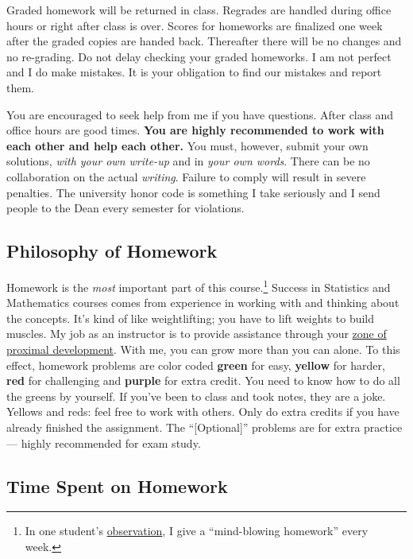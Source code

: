 \documentclass[12pt]{article}
\newcommand{\ingreen}[1]{\color{green}\textbf{#1} \color{black}}
\newcommand{\inyellow}[1]{\color{yellow}\textbf{#1} \color{black}}
\newcommand{\inred}[1]{\color{red}\textbf{#1} \color{black}}
\newcommand{\inpurple}[1]{\color{purple}\textbf{#1} \color{black}}
\newcommand{\qu}[1]{``#1''}
\begin{document}
Graded homework will be returned in class. Regrades are handled during office hours or right after class is over. Scores for homeworks are finalized one week after the graded copies are handed back. Thereafter there will be no changes and no re-grading. Do not delay checking your graded homeworks. I am not perfect and I do make mistakes. It is your obligation to find our mistakes and report them.

You are encouraged to seek help from me if you have questions. After class and office hours are good times. \ingreen{You are highly recommended to work with each other and help each other.} You must, however, submit your own solutions, \textit{with your own write-up} and in \textit{your own words}. There can be no collaboration on the actual \textit{writing}. Failure to comply will result in severe penalties. The university honor code is something I take seriously and I send people to the Dean every semester for violations.

\subsection*{Philosophy of Homework}


Homework is the \textit{most} important part of this course.\footnote{In one student's \href{http://www.ratemyprofessors.com/ShowRatings.jsp?tid=1951051}{observation}, I give a \qu{mind-blowing homework} every week.} Success in Statistics and Mathematics courses comes from experience in working with and thinking about the concepts. It's kind of like weightlifting; you have to lift weights to build muscles. My job as an instructor is to provide assistance through your \href{http://en.wikipedia.org/wiki/Zone_of_proximal_development}{zone of proximal development}. With me, you can grow more than you can alone. To this effect, homework problems are color coded \ingreen{green} for easy, \inyellow{yellow} for harder, \inred{red} for challenging and \inpurple{purple} for extra credit. You need to know how to do all the greens by yourself. If you've been to class and took notes, they are a joke. Yellows and reds: feel free to work with others. Only do extra credits if you have already finished the assignment. The \qu{[Optional]} problems are for extra practice --- highly recommended for exam study.

\subsection*{Time Spent on Homework }
\end{document}
